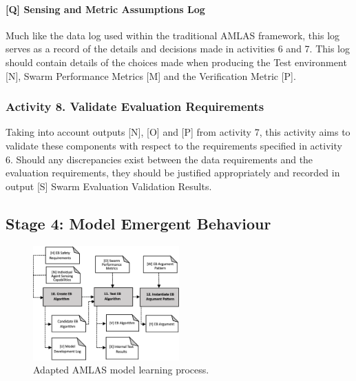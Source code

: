 \documentclass[lettersize,journal]{IEEEtran}
\begin{document}

\paragraph*{[Q] Sensing and Metric Assumptions Log}

Much like the data log used within the traditional AMLAS framework, this log serves as a record of the details and decisions made in activities 6 and 7. This log should contain details of the choices made when producing the Test environment [N], Swarm Performance Metrics [M] and the Verification Metric [P].

\subsubsection*{Activity 8. Validate Evaluation Requirements}

Taking into account outputs [N], [O] and [P] from activity 7, this activity aims to validate these components with respect to the requirements specified in activity 6. Should any discrepancies exist between the data requirements and the evaluation requirements, they should be justified appropriately and recorded in output [S] Swarm Evaluation Validation Results.

\subsection{Stage 4: Model Emergent Behaviour} \label{framework-stage4}


\begin{figure}
	\centering
	\includegraphics[width=0.5\textwidth]{figures/amlas-a-stage4-v2.png}%
	\caption{Adapted AMLAS model learning process.}
	\label{amlas-a-stage4}
\end{figure}
\end{document}
